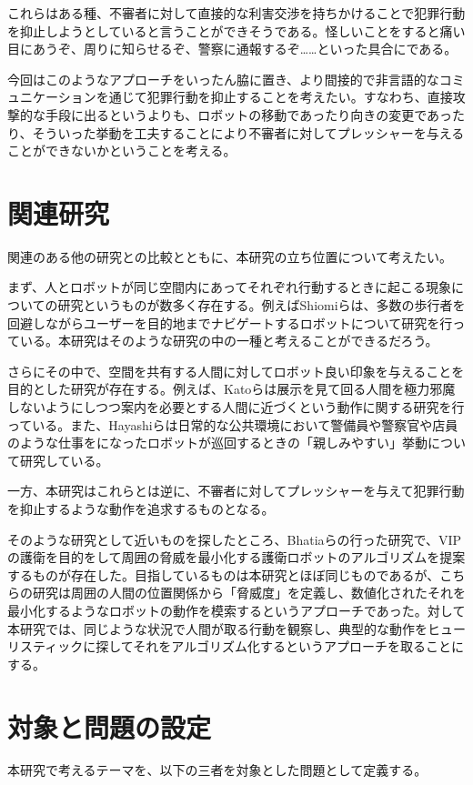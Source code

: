 \documentclass{kuisthesis}
\begin{document}
これらはある種、不審者に対して直接的な利害交渉を持ちかけることで犯罪行動を抑止しようとしていると言うことができそうである。怪しいことをすると痛い目にあうぞ、周りに知らせるぞ、警察に通報するぞ……といった具合にである。

今回はこのようなアプローチをいったん脇に置き、より間接的で非言語的なコミュニケーションを通じて犯罪行動を抑止することを考えたい。すなわち、直接攻撃的な手段に出るというよりも、ロボットの移動であったり向きの変更であったり、そういった挙動を工夫することにより不審者に対してプレッシャーを与えることができないかということを考える。


\section{関連研究}
関連のある他の研究との比較とともに、本研究の立ち位置について考えたい。

まず、人とロボットが同じ空間内にあってそれぞれ行動するときに起こる現象についての研究というものが数多く存在する。例えばShiomiらは、多数の歩行者を回避しながらユーザーを目的地までナビゲートするロボットについて研究を行っている\cite{1}。本研究はそのような研究の中の一種と考えることができるだろう。

さらにその中で、空間を共有する人間に対してロボット良い印象を与えることを目的とした研究が存在する。例えば、Katoらは展示を見て回る人間を極力邪魔しないようにしつつ案内を必要とする人間に近づくという動作に関する研究\cite{2}を行っている。また、Hayashiらは日常的な公共環境において警備員や警察官や店員のような仕事をになったロボットが巡回するときの「親しみやすい」挙動について研究している\cite{3}。

一方、本研究はこれらとは逆に、不審者に対してプレッシャーを与えて犯罪行動を抑止するような動作を追求するものとなる。

そのような研究として近いものを探したところ、Bhatiaらの行った研究で、VIPの護衛を目的をして周囲の脅威を最小化する護衛ロボットのアルゴリズムを提案するもの\cite{4}が存在した。目指しているものは本研究とほぼ同じものであるが、こちらの研究\cite{3}は周囲の人間の位置関係から「脅威度」を定義し、数値化されたそれを最小化するようなロボットの動作を模索するというアプローチであった。対して本研究では、同じような状況で人間が取る行動を観察し、典型的な動作をヒューリスティックに探してそれをアルゴリズム化するというアプローチを取ることにする。

\section{対象と問題の設定}
本研究で考えるテーマを、以下の三者を対象とした問題として定義する。
\end{document}
